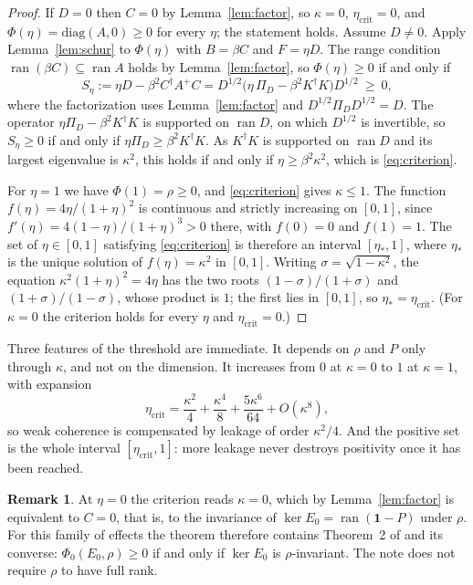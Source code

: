 \documentclass[11pt,a4paper]{article}
\theoremstyle{definition}
\newtheorem{remark}[theorem]{Remark}
\theoremstyle{plain}
\DeclareMathOperator{\ran}{ran}
\newcommand{\one}{\mathbf{1}}
\newcommand{\etac}{\eta_{\mathrm{crit}}}
\begin{document}
\begin{proof}
If $D=0$ then $C=0$ by Lemma~\ref{lem:factor}, so $\kappa=0$, $\etac=0$, and
$\Phi(\eta)=\mathrm{diag}(A,0)\ge0$ for every $\eta$; the statement holds.
Assume $D\ne0$. Apply Lemma~\ref{lem:schur} to $\Phi(\eta)$ with $B=\beta C$ and
$F=\eta D$. The range condition $\ran(\beta C)\subseteq\ran A$ holds by
Lemma~\ref{lem:factor}, so $\Phi(\eta)\ge0$ if and only if
\[
S_\eta:=\eta D-\beta^2C^\dagger A^+C
=D^{1/2}\bigl(\eta\,\Pi_D-\beta^2K^\dagger K\bigr)D^{1/2}\ \ge\ 0,
\]
where the factorization uses Lemma~\ref{lem:factor} and $D^{1/2}\Pi_DD^{1/2}=D$.
The operator $\eta\Pi_D-\beta^2K^\dagger K$ is supported on $\ran D$, on which
$D^{1/2}$ is invertible, so $S_\eta\ge0$ if and only if
$\eta\Pi_D\ge\beta^2K^\dagger K$. As $K^\dagger K$ is supported on $\ran D$ and
its largest eigenvalue is $\kappa^2$, this holds if and only if
$\eta\ge\beta^2\kappa^2$, which is \eqref{eq:criterion}.

For $\eta=1$ we have $\Phi(1)=\rho\ge0$, and \eqref{eq:criterion} gives
$\kappa\le1$. The function $f(\eta)=4\eta/(1+\eta)^2$ is continuous and strictly
increasing on $[0,1]$, since $f'(\eta)=4(1-\eta)/(1+\eta)^3>0$ there, with
$f(0)=0$ and $f(1)=1$. The set of $\eta\in[0,1]$ satisfying
\eqref{eq:criterion} is therefore an interval $[\eta_*,1]$, where $\eta_*$ is
the unique solution of $f(\eta)=\kappa^2$ in $[0,1]$. Writing
$\sigma=\sqrt{1-\kappa^2}$, the equation $\kappa^2(1+\eta)^2=4\eta$ has the two
roots $(1-\sigma)/(1+\sigma)$ and $(1+\sigma)/(1-\sigma)$, whose product is
$1$; the first lies in $[0,1]$, so $\eta_*=\etac$. (For $\kappa=0$ the
criterion holds for every $\eta$ and $\etac=0$.)
\end{proof}

Three features of the threshold are immediate. It depends on $\rho$ and $P$
only through $\kappa$, and not on the dimension. It increases from $0$ at
$\kappa=0$ to $1$ at $\kappa=1$, with expansion
\[
\etac=\frac{\kappa^2}{4}+\frac{\kappa^4}{8}+\frac{5\kappa^6}{64}+O(\kappa^8),
\]
so weak coherence is compensated by leakage of order $\kappa^2/4$. And the
positive set is the whole interval $[\etac,1]$: more leakage never destroys
positivity once it has been reached.

\begin{remark}\label{rem:eta0}
At $\eta=0$ the criterion reads $\kappa=0$, which by Lemma~\ref{lem:factor} is
equivalent to $C=0$, that is, to the invariance of $\ker E_0=\ran(\one-P)$ under
$\rho$. For this family of effects the theorem therefore contains Theorem~2 of
\cite{KamWong2026} and its converse: $\Phi_0(E_0,\rho)\ge0$ if and only if
$\ker E_0$ is $\rho$-invariant. The note does not require $\rho$ to have full
rank.
\end{remark}
\end{document}
